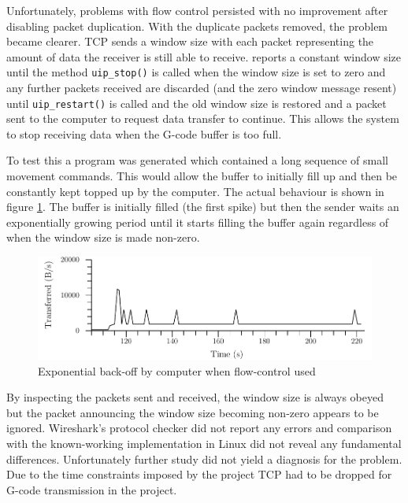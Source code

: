 		\label{sec:tcpProblem}
		
		Unfortunately, problems with flow control persisted with no improvement
		after disabling packet duplication. With the duplicate packets removed, the
		problem became clearer. TCP sends a window size with each packet
		representing the amount of data the receiver is still able to receive.
		\uIP{} reports a constant window size until the method \verb|uip_stop()| is
		called when the window size is set to zero and any further packets received
		are discarded (and the zero window message resent) until
		\verb|uip_restart()| is called and the old window size is restored and a
		packet sent to the computer to request data transfer to continue. This
		allows the system to stop receiving data when the G-code buffer is too full.
		
		To test this a program was generated which contained a long sequence of
		small movement commands. This would allow the buffer to initially fill up
		and then be constantly kept topped up by the computer. The actual behaviour
		is shown in figure \ref{fig:uIPFlowControl}. The buffer is initially filled
		(the first spike) but then the sender waits an exponentially growing period
		until it starts filling the buffer again regardless of when the window size
		is made non-zero.
		
		\begin{figure}
			\includegraphics[width=1\textwidth]{diagrams/uIPFlowControl.pdf}
			\caption{Exponential back-off by computer when \uIP{} flow-control used}
			\label{fig:uIPFlowControl}
		\end{figure}
		
		By inspecting the packets sent and received, the window size is always
		obeyed but the packet announcing the window size becoming non-zero appears
		to be ignored. Wireshark's protocol checker did not report any errors and
		comparison with the known-working implementation in Linux did not reveal any
		fundamental differences. Unfortunately further study did not yield a
		diagnosis for the problem. Due to the time constraints imposed by the
		project TCP had to be dropped for G-code transmission in the project.
	
